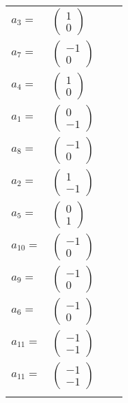 \documentclass[1p]{elsarticle_modified}
\theoremstyle{definition}
\begin{document}
\begin{tabular}{m{7pt} m{180pt} m{7pt} m{180pt} }
\flushright $a_{3}=$&$\begin{pmatrix}1\\0\end{pmatrix}$ \\
\flushright $a_{7}=$&$\begin{pmatrix}-1\\0\end{pmatrix}$ \\
\flushright $a_{4}=$&$\begin{pmatrix}1\\0\end{pmatrix}$ \\
\flushright $a_{1}=$&$\begin{pmatrix}0\\-1\end{pmatrix}$ \\
\flushright $a_{8}=$&$\begin{pmatrix}-1\\0\end{pmatrix}$ \\
\flushright $a_{2}=$&$\begin{pmatrix}1\\-1\end{pmatrix}$ \\
\flushright $a_{5}=$&$\begin{pmatrix}0\\1\end{pmatrix}$ \\
\flushright $a_{10}=$&$\begin{pmatrix}-1\\0\end{pmatrix}$ \\
\flushright $a_{9}=$&$\begin{pmatrix}-1\\0\end{pmatrix}$ \\
\flushright $a_{6}=$&$\begin{pmatrix}-1\\0\end{pmatrix}$ \\
\flushright $a_{11}=$&$\begin{pmatrix}-1\\-1\end{pmatrix}$\\ \flushright $a_{11}=$&$\begin{pmatrix}-1\\-1\end{pmatrix}$\\&\end{tabular}
\end{document}
